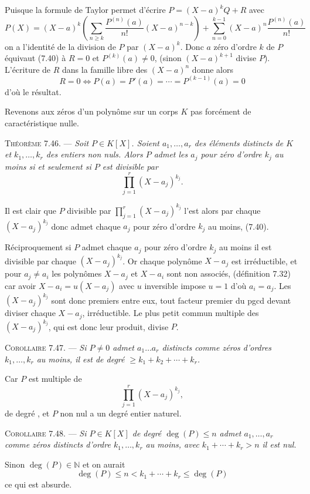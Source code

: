 Puisque la formule de Taylor permet d'écrire $P=(X-a)^kQ+R$ avec
\[
P(X)=(X-a)^k\left(\sum_{n\ge k}\frac{P^{(n)}(a)}{n!}(X-a)^{n-k}\right)
+\sum_{n=0}^{k-1}(X-a)^n\frac{P^{(n)}(a)}{n!}
\]
on a l'identité de la division de $P$ par $(X-a)^k$. Donc $a$ zéro d'ordre $k$ de $P$ équivaut (7.40) à $R=0$ et $P^{(k)}(a)\ne0$, (sinon $(X-a)^{k+1}$ divise $P$). L'écriture de $R$ dans la famille libre des $(X-a)^n$ donne alors
\[
R=0\Longleftrightarrow P(a)=P'(a)=\cdots=P^{(k-1)}(a)=0
\]
d'où le résultat. \bookend

Revenons aux zéros d'un polynôme sur un corps $K$ pas forcément de caractéristique nulle.

\medskip\noindent\textsc{Théorème 7.46.} --- \emph{Soit $P\in K[X]$. Soient $a_1,\ldots,a_r$ des éléments distincts de $K$ et $k_1,\ldots,k_r$ des entiers non nuls. Alors $P$ admet les $a_j$ pour zéro d'ordre $k_j$ au moins si et seulement si $P$ est divisible par
\[
\prod_{j=1}^r(X-a_j)^{k_j}.
\]}

Il est clair que $P$ divisible par $\prod_{j=1}^r(X-a_j)^{k_j}$ l'est alors par chaque $(X-a_j)^{k_j}$ donc admet chaque $a_j$ pour zéro d'ordre $k_j$ au moins, (7.40).

Réciproquement si $P$ admet chaque $a_j$ pour zéro d'ordre $k_j$ au moins il est divisible par chaque $(X-a_j)^{k_j}$. Or chaque polynôme $X-a_j$ est irréductible, et pour $a_j\ne a_i$ les polynômes $X-a_j$ et $X-a_i$ sont non associés, (définition 7.32) car avoir $X-a_i=u(X-a_j)$ avec $u$ inversible impose $u=1$ d'où $a_i=a_j$. Les $(X-a_j)^{k_j}$ sont donc premiers entre eux, tout facteur premier du pgcd devant diviser chaque $X-a_j$, irréductible. Le plus petit commun multiple des $(X-a_j)^{k_j}$, qui est donc leur produit, divise $P$. \bookend

\medskip\noindent\textsc{Corollaire 7.47.} --- \emph{Si $P\ne0$ admet $a_1\ldots a_r$ distincts comme zéros d'ordres $k_1,\ldots,k_r$ au moins, il est de degré $\ge k_1+k_2+\cdots+k_r$.}

Car $P$ est multiple de
\[
\prod_{j=1}^r(X-a_j)^{k_j},
\]
de degré , et $P$ non nul a un degré entier naturel. \bookend

\medskip\noindent\textsc{Corollaire 7.48.} --- \emph{Si $P\in K[X]$ de degré $\deg(P)\le n$ admet $a_1,\ldots,a_r$ comme zéros distincts d'ordre $k_1,\ldots,k_r$ au moins, avec $k_1+\cdots+k_r>n$ il est nul.}

Sinon $\deg(P)\in\mathbb N$ et on aurait
\[
\deg(P)\le n<k_1+\cdots+k_r\le\deg(P)
\]
ce qui est absurde. \bookend

